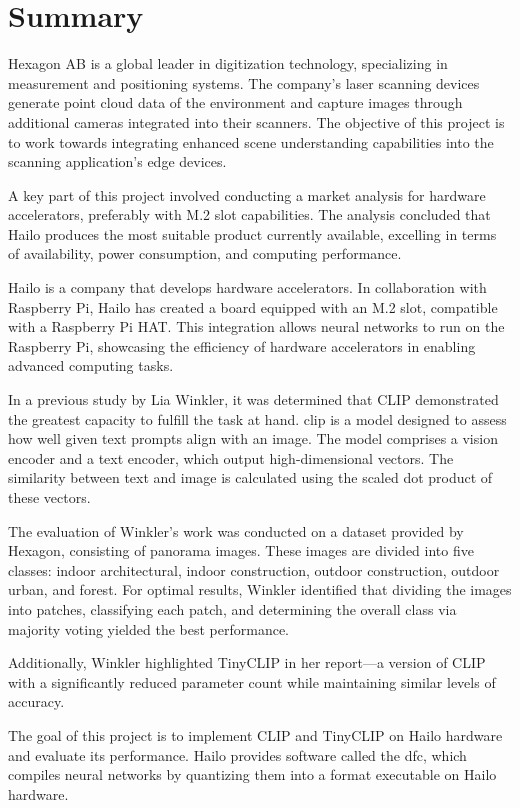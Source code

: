 \chapter*{Summary}
Hexagon AB is a global leader in digitization technology, specializing in measurement and positioning systems.  
The company's laser scanning devices generate point cloud data of the environment and capture images through additional cameras integrated into their scanners.  
The objective of this project is to work towards integrating enhanced scene understanding capabilities into the scanning application's edge devices.

A key part of this project involved conducting a market analysis for hardware accelerators, preferably with M.2 slot capabilities.  
The analysis concluded that Hailo produces the most suitable product currently available, excelling in terms of availability, power consumption, and computing performance.

Hailo is a company that develops hardware accelerators.  
In collaboration with Raspberry Pi, Hailo has created a board equipped with an M.2 slot, compatible with a Raspberry Pi HAT.  
This integration allows neural networks to run on the Raspberry Pi, showcasing the efficiency of hardware accelerators in enabling advanced computing tasks.\hfill\break

In a previous study by Lia Winkler, it was determined that CLIP demonstrated the greatest capacity to fulfill the task at hand.  
\acrfull{clip} is a model designed to assess how well given text prompts align with an image.  
The model comprises a vision encoder and a text encoder, which output high-dimensional vectors.  
The similarity between text and image is calculated using the scaled dot product of these vectors.  

The evaluation of Winkler's work was conducted on a dataset provided by Hexagon, consisting of panorama images.  
These images are divided into five classes: indoor architectural, indoor construction, outdoor construction, outdoor urban, and forest.  
For optimal results, Winkler identified that dividing the images into patches, classifying each patch, and determining the overall class via majority voting yielded the best performance.  

Additionally, Winkler highlighted TinyCLIP in her report—a version of CLIP with a significantly reduced parameter count while maintaining similar levels of accuracy. \hfill\break

The goal of this project is to implement CLIP and TinyCLIP on Hailo hardware and evaluate its performance.  
Hailo provides software called the \acrfull{dfc}, which compiles neural networks by quantizing them into a format executable on Hailo hardware.  

